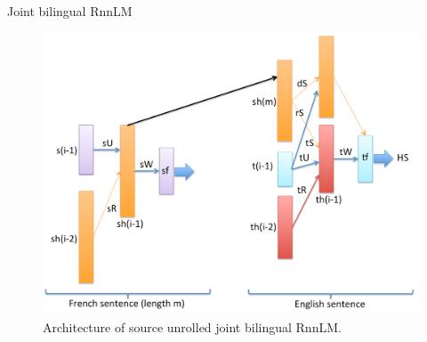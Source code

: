 \documentclass[pdf]{beamer}
\begin{document}

\begin{frame}{Joint bilingual RnnLM}
\begin{figure}
\begin{center}
\includegraphics[scale=0.225]{unroll_pipe_rnn.png}
\end{center}
\caption{\scriptsize{Architecture of source unrolled joint bilingual RnnLM.}}
\end{figure}
\end{frame}
\end{document}
